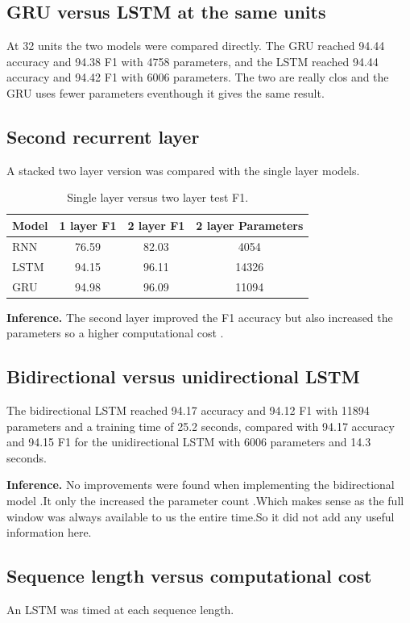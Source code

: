 \documentclass[12pt]{article}
\begin{document}
\subsection{GRU versus LSTM at the same units}
At 32 units the two models were compared directly. The GRU reached 94.44 accuracy and 94.38 F1 with 4758 parameters, and the LSTM reached 94.44 accuracy and 94.42 F1 with 6006 parameters. The two are really clos  and the GRU uses fewer parameters eventhough it gives the same result.

\subsection{Second recurrent layer}
A stacked two layer version was compared with the single layer models.

\begin{table}[H]
\centering
\caption{Single layer versus two layer test F1.}
\begin{tabular}{@{}lccc@{}}
\toprule
Model & 1 layer F1 & 2 layer F1 & 2 layer Parameters \\
\midrule
RNN & 76.59 & 82.03 & 4054 \\
LSTM & 94.15 & 96.11 & 14326 \\
GRU & 94.98 & 96.09 & 11094 \\
\bottomrule
\end{tabular}
\end{table}

\noindent\textbf{Inference.}
The second layer improved the F1 accuracy but also increased the parameters so a  higher computational cost .


\subsection{Bidirectional versus unidirectional LSTM}
The bidirectional LSTM reached 94.17 accuracy and 94.12 F1 with 11894 parameters and a training time of 25.2 seconds, compared with 94.17 accuracy and 94.15 F1 for the unidirectional LSTM with 6006 parameters and 14.3 seconds.

\noindent\textbf{Inference.} 
No improvements were found when implementing the bidirectional model .It only the increased the parameter count .Which makes sense as the full window was always available to us the entire time.So it did not add any useful information here.


\subsection{Sequence length versus computational cost}
An LSTM was timed at each sequence length.
\end{document}

